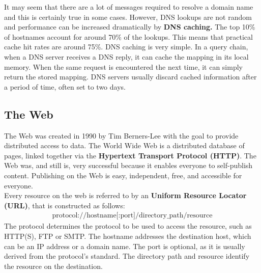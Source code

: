 It may seem that there are a lot of messages required to resolve a domain name and this is certainly true in some cases. However, DNS lookups are not random and performance can be increased dramatically by \textbf{DNS caching.} The top 10\% of hostnames account for around 70\% of the lookups. This means that practical cache hit rates are around 75\%. DNS caching is very simple. In a query chain, when a DNS server receives a DNS reply, it can cache the mapping in its local memory. When the same request is encountered the next time, it can simply return the stored mapping. DNS servers usually discard cached information after a period of time, often set to two days.

\subsection{The Web}
The Web was created in 1990 by Tim Berners-Lee with the goal to provide distributed access to data. The World Wide Web is a distributed database of pages, linked together via the \textbf{Hypertext Transport Protocol (HTTP)}. The Web was, and still is, very successful because it enables everyone to self-publish content. Publishing on the Web is easy, independent, free, and accessible for everyone.\vspace{.3cm}\\
Every resource on the web is referred to by an \textbf{Uniform Resource Locator (URL)}, that is constructed as follows:
\begin{align*}
\text{protocol://hostname[:port]/directory\_path/resource}
\end{align*}
The protocol determines the protocol to be used to access the resource, such as HTTP(S), FTP or SMTP. The hostname addresses the destination host, which can be an IP address or a domain name. The port is optional, as it is usually derived from the protocol's standard. The directory path and resource identify the resource on the destination.

